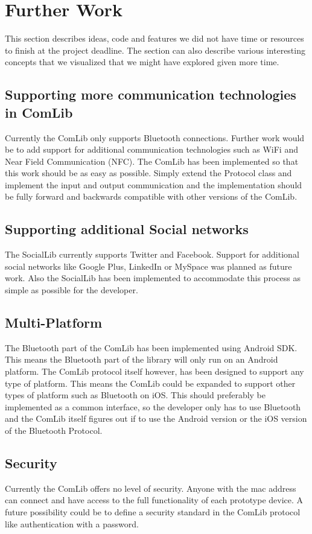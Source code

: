 \section{Further Work}
This section describes ideas, code and features we did not have time or resources to
finish at the project deadline. The section can also describe various interesting concepts 
that we visualized that we might have explored given more time.

\subsection{Supporting more communication technologies in ComLib}
Currently the ComLib only supports Bluetooth connections. Further work would be
to add support for additional communication technologies such as WiFi and Near Field 
Communication (NFC). The ComLib has been implemented so that this work should
be as easy as possible. Simply extend the Protocol class and implement the input and
output communication and the implementation should be fully forward and backwards
compatible with other versions of the ComLib.

\subsection{Supporting additional Social networks}
The SocialLib currently supports Twitter and Facebook. Support for additional social
networks like Google Plus, LinkedIn or MySpace was planned as future work. Also the
SocialLib has been implemented to accommodate this process as simple as possible
for the developer.

\subsection{Multi-Platform}
The Bluetooth part of the ComLib has been implemented using Android SDK. This means 
the Bluetooth part of the library will only run on an Android platform. The ComLib protocol
itself however, has been designed to support any type of platform. This means the ComLib
could be expanded to support other types of platform such as Bluetooth on iOS. This
should preferably be implemented as a common interface, so the developer only has to use
Bluetooth and the ComLib itself figures out if to use the Android version or the iOS version of
the Bluetooth Protocol.

\subsection{Security}
Currently the ComLib offers no level of security. Anyone with the mac address can connect
and have access to the full functionality of each prototype device. A future possibility could
be to define a security standard in the ComLib protocol like authentication with a password.
